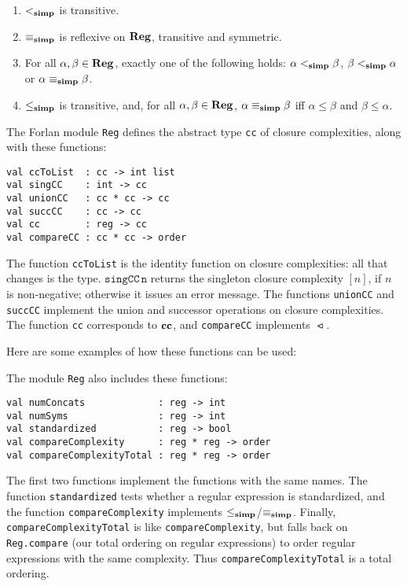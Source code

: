 \begin{proposition}
\begin{enumerate}[\quad(1)]
\item $\mathrel{<_{\mathbf{simp}}}$ is transitive.

\item $\mathrel{\equiv_{\mathbf{simp}}}$ is reflexive on $\mathbf{Reg}$, transitive and symmetric.

\item For all $\alpha,\beta\in\mathbf{Reg}$, exactly one of the following holds:
$\alpha\mathrel{<_{\mathbf{simp}}}\beta$, $\beta\mathrel{<_{\mathbf{simp}}}\alpha$ or $\alpha\mathrel{\equiv_{\mathbf{simp}}}\beta$.

\item $\mathrel{\leq_{\mathbf{simp}}}$ is transitive, and, for all $\alpha,\beta\in\mathbf{Reg}$,
$\alpha\mathrel{\equiv_{\mathbf{simp}}}\beta$ iff $\alpha\leq\beta$ and $\beta\leq\alpha$.
\end{enumerate}
\end{proposition}

The Forlan module \texttt{Reg} defines the abstract type \texttt{cc}
of closure complexities, along with these functions:
\begin{verbatim}
val ccToList  : cc -> int list
val singCC    : int -> cc
val unionCC   : cc * cc -> cc
val succCC    : cc -> cc
val cc        : reg -> cc
val compareCC : cc * cc -> order
\end{verbatim}
The function \texttt{ccToList} is the identity function on closure
complexities: all that changes is the type.  $\mathtt{singCC\,n}$
returns the singleton closure complexity $[n]$, if $n$ is non-negative;
otherwise it issues an error message.  The functions \texttt{unionCC}
and \texttt{succCC} implement the union and successor operations on
closure complexities.  The function \texttt{cc} corresponds to $\mathbf{cc}$, and
\texttt{compareCC} implements $\ltcc$.

Here are some examples of how these functions can be used:


The module \texttt{Reg} also includes these functions:
\begin{verbatim}
val numConcats             : reg -> int
val numSyms                : reg -> int
val standardized           : reg -> bool
val compareComplexity      : reg * reg -> order
val compareComplexityTotal : reg * reg -> order
\end{verbatim}
%
%
The first two functions implement the functions with the same names.
The function \texttt{standardized} tests whether a regular expression
is standardized, and the function \texttt{compareComplexity} implements
$\mathrel{\leq_{\mathbf{simp}}}$/$\mathrel{\equiv_{\mathbf{simp}}}$. Finally, \texttt{compareComplexityTotal} is like
\texttt{compareComplexity}, but falls back on \texttt{Reg.compare}
(our total ordering on regular expressions) to order regular expressions
with the same complexity.  Thus \texttt{compareComplexityTotal} is
a total ordering.

